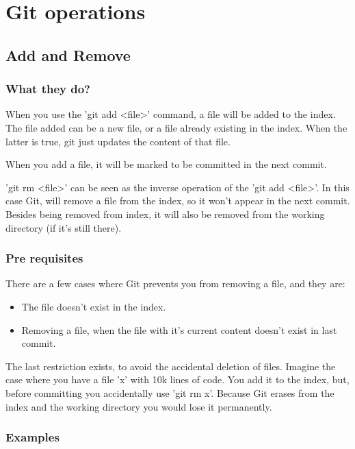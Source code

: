 \section{Git operations}

\subsection{Add and Remove}

\subsubsection{What they do?}

When you use the 'git add <file>' command, a file will be
added to the index. The file added can be a new file, or 
a file already existing in the index. When the latter is true, 
git just updates the content of that file. \par
When you add a file, it will be marked to be committed in the next
commit. \par
'git rm <file>' can be seen as the inverse operation of the 'git add <file>'.
In this case Git, will remove a file from the index, so it won't appear in the
next commit. Besides being removed from index, it will also be removed from the 
working directory (if it's still there). \par

\subsubsection{Pre requisites}

There are a few cases where Git prevents you from removing a file, and they are: 
\begin{itemize}
\item The file doesn't exist in the index.
\item Removing a file, when the file with it's current content 
doesn't exist in last commit.
\end{itemize}
The last restriction exists, to avoid the accidental deletion of files. Imagine the
case where you have a file 'x' with 10k lines of code. You add it to the index,
but, before committing you accidentally use 'git rm x'. Because Git erases from
the index and the working directory you would lose it permanently. \par

\subsubsection{Examples}

